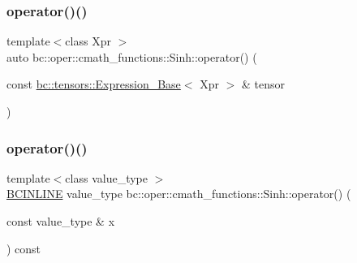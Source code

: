 \mbox{\label{structbc_1_1oper_1_1cmath__functions_1_1Sinh_ad7b3c6850cbd3ec3817642edde48a032}} 
\subsubsection{\texorpdfstring{operator()()}{operator()()}\hspace{0.1cm}{\footnotesize\ttfamily [2/3]}}
{\footnotesize\ttfamily template$<$class Xpr $>$ \\
auto bc\+::oper\+::cmath\+\_\+functions\+::\+Sinh\+::operator() (\begin{DoxyParamCaption}\item[{const \hyperlink{classbc_1_1tensors_1_1Expression__Base}{bc\+::tensors\+::\+Expression\+\_\+\+Base}$<$ Xpr $>$ \&}]{tensor }\end{DoxyParamCaption})\hspace{0.3cm}{\ttfamily [inline]}}

\mbox{\label{structbc_1_1oper_1_1cmath__functions_1_1Sinh_aa37b1b580efe9077881120014793739d}} 
\subsubsection{\texorpdfstring{operator()()}{operator()()}\hspace{0.1cm}{\footnotesize\ttfamily [3/3]}}
{\footnotesize\ttfamily template$<$class value\+\_\+type $>$ \\
\hyperlink{common_8h_a6699e8b0449da5c0fafb878e59c1d4b1}{B\+C\+I\+N\+L\+I\+NE} value\+\_\+type bc\+::oper\+::cmath\+\_\+functions\+::\+Sinh\+::operator() (\begin{DoxyParamCaption}\item[{const value\+\_\+type \&}]{x }\end{DoxyParamCaption}) const\hspace{0.3cm}{\ttfamily [inline]}}




